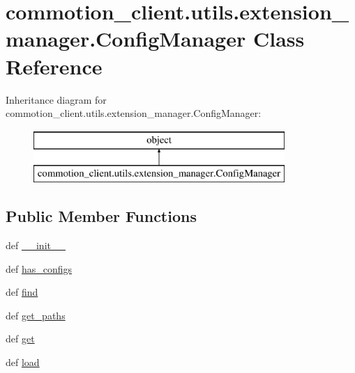 \hypertarget{classcommotion__client_1_1utils_1_1extension__manager_1_1ConfigManager}{\section{commotion\-\_\-client.\-utils.\-extension\-\_\-manager.\-Config\-Manager Class Reference}
\label{classcommotion__client_1_1utils_1_1extension__manager_1_1ConfigManager}
}
Inheritance diagram for commotion\-\_\-client.\-utils.\-extension\-\_\-manager.\-Config\-Manager\-:\begin{figure}[H]
\begin{center}
\leavevmode
\includegraphics[height=2.000000cm]{classcommotion__client_1_1utils_1_1extension__manager_1_1ConfigManager}
\end{center}
\end{figure}
\subsection*{Public Member Functions}
\begin{DoxyCompactItemize}
\item 
def \hyperlink{classcommotion__client_1_1utils_1_1extension__manager_1_1ConfigManager_a152c0575bbf11ee6c2c1c24e300a7034}{\-\_\-\-\_\-init\-\_\-\-\_\-}
\item 
def \hyperlink{classcommotion__client_1_1utils_1_1extension__manager_1_1ConfigManager_ab8bb11d6b12687d9a7e22953d3125ef9}{has\-\_\-configs}
\item 
def \hyperlink{classcommotion__client_1_1utils_1_1extension__manager_1_1ConfigManager_a540ef57dff72ba46c043abd217e221cf}{find}
\item 
def \hyperlink{classcommotion__client_1_1utils_1_1extension__manager_1_1ConfigManager_ac8075c8f0e46b33f63c4b79f91d2ee3e}{get\-\_\-paths}
\item 
def \hyperlink{classcommotion__client_1_1utils_1_1extension__manager_1_1ConfigManager_aa5d4504ee2b1a228e0543e0bd4313b88}{get}
\item 
def \hyperlink{classcommotion__client_1_1utils_1_1extension__manager_1_1ConfigManager_a3da851319b205bf97e350946b4408ff8}{load}
\end{DoxyCompactItemize}
